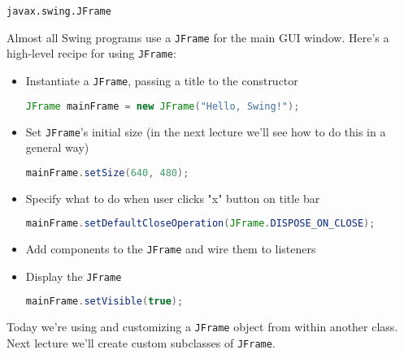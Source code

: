 \documentclass{beamer}
\begin{document}
\begin{frame}[fragile]{{\tt javax.swing.JFrame}}

\vspace{-.1in}
Almost all Swing programs use a {\tt JFrame} for the main GUI window. Here's a high-level recipe for using {\tt JFrame}:
\vspace{-.05in}
\begin{itemize}
\item Instantiate a {\tt JFrame}, passing a title to the constructor
\begin{lstlisting}[language=Java]
        JFrame mainFrame = new JFrame("Hello, Swing!");
\end{lstlisting}
\vspace{-.05in}
\item Set {\tt JFrame}'s initial size (in the next lecture we'll see how to do this in a general way)
\begin{lstlisting}[language=Java]
        mainFrame.setSize(640, 480);
\end{lstlisting}
\vspace{-.05in}
\item Specify what to do when user clicks "x" button on title bar
\begin{lstlisting}[language=Java]
      mainFrame.setDefaultCloseOperation(JFrame.DISPOSE_ON_CLOSE);
\end{lstlisting}
\vspace{-.05in}
\item Add components to the {\tt JFrame} and wire them to listeners
\item Display the {\tt JFrame}
\begin{lstlisting}[language=Java]
        mainFrame.setVisible(true);
\end{lstlisting}
\end{itemize}
\vspace{-.05in}
Today we're using and customizing a {\tt JFrame} object from within another class.  Next lecture we'll create custom subclasses of {\tt JFrame}.

\end{frame}
\end{document}
